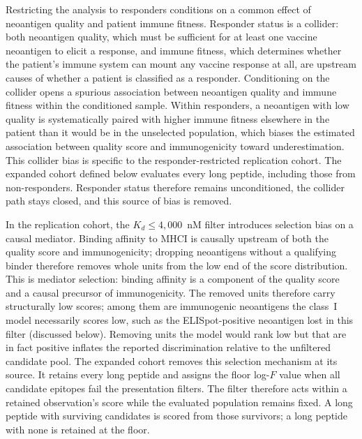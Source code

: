 \documentclass[11pt]{article}
\begin{document}
Restricting the analysis to responders conditions on a common
effect of neoantigen quality and patient immune fitness.
Responder status is a collider: both neoantigen quality, which
must be sufficient for at least one vaccine neoantigen to
elicit a response, and immune fitness, which determines whether
the patient's immune system can mount any vaccine response at
all, are upstream causes of whether a patient is classified as
a responder.
Conditioning on the collider opens a spurious association
between neoantigen quality and immune fitness within the
conditioned sample.
Within responders, a neoantigen with low quality is
systematically paired with higher immune fitness elsewhere in
the patient than it would be in the unselected population,
which biases the estimated association between quality score
and immunogenicity toward underestimation.
This collider bias is specific to the responder-restricted replication cohort.
The expanded cohort defined below evaluates every long peptide, including those
from non-responders. Responder status therefore remains unconditioned, the
collider path stays closed, and this source of bias is removed.

In the replication cohort, the $K_d \leq 4{,}000$~nM filter
introduces selection bias on a causal mediator.
Binding affinity to MHCI is causally upstream of both the
quality score and immunogenicity; dropping neoantigens without
a qualifying binder therefore removes whole units from the low
end of the score distribution.
This is mediator selection: binding affinity is a component of the quality
score and a causal precursor of immunogenicity.
The removed units therefore carry structurally low scores;
among them are immunogenic neoantigens the class~I model
necessarily scores low, such as the ELISpot-positive neoantigen
lost in this filter (discussed below).
Removing units the model would rank low but that are in fact
positive inflates the reported discrimination relative to the
unfiltered candidate pool.
The expanded cohort removes this selection mechanism at its source. It retains
every long peptide and assigns the floor log-$F$ value when all candidate
epitopes fail the presentation filters. The filter therefore acts within a
retained observation's score while the evaluated population remains fixed. A long peptide with
surviving candidates is scored from those survivors; a long
peptide with none is retained at the floor.
\end{document}
